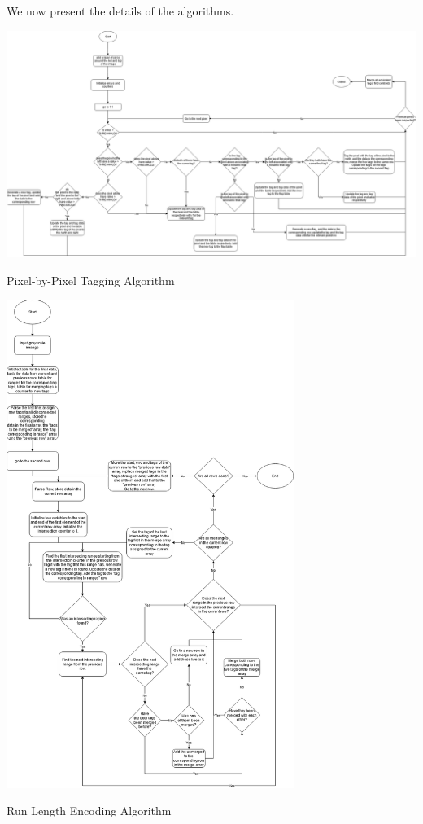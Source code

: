 \documentclass[../../main.tex]{subfiles}
\begin{document}
We now present the details of the algorithms.




\begin{Flowchart}
    \centering
    \includegraphics[width=\textwidth]{Figures/Electrical/centroiding_2_non_coding.png}
    \caption{Pixel-by-Pixel Tagging Algorithm}
    \label{FC:pbp_centroiding}
\end{Flowchart}

\begin{Flowchart}
    \centering
    \includegraphics[width = 0.7\textwidth]{Figures/Electrical/centroiding_3.png}
    \caption{Run Length Encoding Algorithm}
    \label{FC:flow_fe_rle}
\end{Flowchart}
\end{document}
